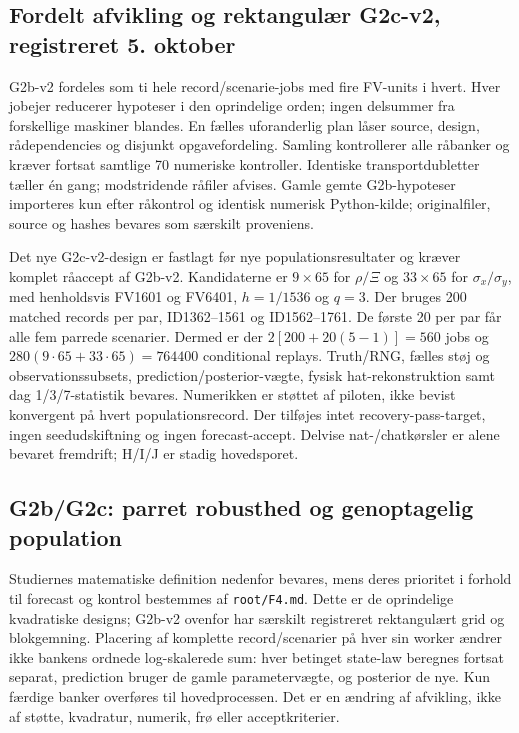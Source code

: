 \subsection{Fordelt afvikling og rektangulær G2c-v2, registreret 5. oktober}
G2b-v2 fordeles som ti hele record/scenarie-jobs med fire FV-units i hvert.
Hver jobejer reducerer hypoteser i den oprindelige orden; ingen delsummer
fra forskellige maskiner blandes. En fælles uforanderlig plan låser source,
design, rådependencies og disjunkt opgavefordeling. Samling kontrollerer alle
råbanker og kræver fortsat samtlige 70 numeriske kontroller. Identiske
transportdubletter tæller én gang; modstridende råfiler afvises. Gamle gemte
G2b-hypoteser importeres kun efter råkontrol og identisk numerisk Python-kilde;
originalfiler, source og hashes bevares som særskilt proveniens.

Det nye G2c-v2-design er fastlagt før nye populationsresultater og kræver
komplet råaccept af G2b-v2. Kandidaterne er $9\times65$ for $\rho/\Xi$ og
$33\times65$ for $\sigma_x/\sigma_y$, med henholdsvis FV1601 og FV6401,
$h=1/1536$ og $q=3$. Der bruges 200 matched records per par, ID1362--1561
og ID1562--1761. De første 20 per par får alle fem parrede scenarier.
Dermed er der $2[200+20(5-1)]=560$ jobs og
$280(9\cdot65+33\cdot65)=764400$ conditional replays. Truth/RNG,
fælles støj og observationssubsets, prediction/posterior-vægte, fysisk
hat-rekonstruktion samt dag 1/3/7-statistik bevares. Numerikken er støttet
af piloten, ikke bevist konvergent på hvert populationsrecord. Der tilføjes
intet recovery-pass-target, ingen seedudskiftning og ingen forecast-accept.
Delvise nat-/chatkørsler er alene bevaret fremdrift; H/I/J er stadig hovedsporet.

\subsection{G2b/G2c: parret robusthed og genoptagelig population}
Studiernes matematiske definition nedenfor bevares, mens deres prioritet i
forhold til forecast og kontrol bestemmes af \texttt{root/F4.md}.
Dette er de oprindelige kvadratiske designs; G2b-v2 ovenfor har særskilt
registreret rektangulært grid og blokgemning.
Placering af komplette record/scenarier på hver sin worker ændrer ikke
bankens ordnede log-skalerede sum: hver betinget state-law beregnes fortsat
separat, prediction bruger de gamle parametervægte, og posterior de nye.
Kun færdige banker overføres til hovedprocessen. Det er en ændring af afvikling,
ikke af støtte, kvadratur, numerik, frø eller acceptkriterier.

